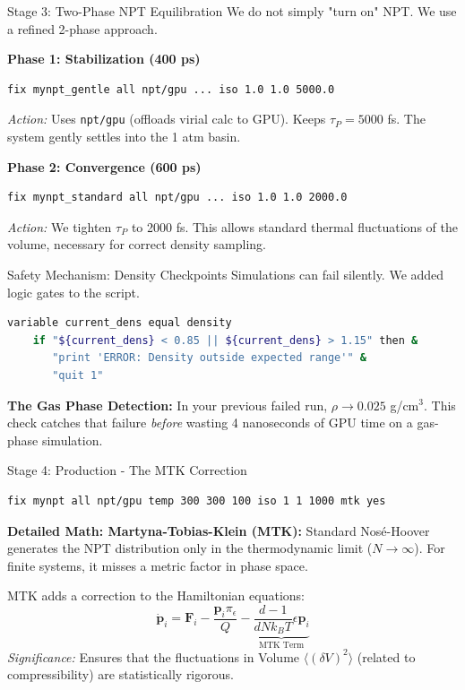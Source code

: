 \documentclass[aspectratio=169, 10pt]{beamer}
\begin{document}
\begin{frame}[fragile]{Stage 3: Two-Phase NPT Equilibration}
    We do not simply "turn on" NPT. We use a refined 2-phase approach.
    
    \textbf{Phase 1: Stabilization (400 ps)}
    \begin{lstlisting}[language=bash]
    fix mynpt_gentle all npt/gpu ... iso 1.0 1.0 5000.0
    \end{lstlisting}
    \textit{Action:} Uses \texttt{npt/gpu} (offloads virial calc to GPU). Keeps $\tau_P = 5000$ fs. The system gently settles into the 1 atm basin.

    \textbf{Phase 2: Convergence (600 ps)}
    \begin{lstlisting}[language=bash]
    fix mynpt_standard all npt/gpu ... iso 1.0 1.0 2000.0
    \end{lstlisting}
    \textit{Action:} We tighten $\tau_P$ to 2000 fs. This allows standard thermal fluctuations of the volume, necessary for correct density sampling.
\end{frame}

\begin{frame}[fragile]{Safety Mechanism: Density Checkpoints}
    Simulations can fail silently. We added logic gates to the script.

    \begin{lstlisting}[language=bash]
    variable current_dens equal density
    if "${current_dens} < 0.85 || ${current_dens} > 1.15" then &
       "print 'ERROR: Density outside expected range'" &
       "quit 1"
    \end{lstlisting}

    \textbf{The Gas Phase Detection:}
    In your previous failed run, $\rho \to 0.025$ g/cm$^3$.
    This check catches that failure \textit{before} wasting 4 nanoseconds of GPU time on a gas-phase simulation.
\end{frame}

\begin{frame}[fragile]{Stage 4: Production - The MTK Correction}
    \begin{lstlisting}[language=bash]
    fix mynpt all npt/gpu temp 300 300 100 iso 1 1 1000 mtk yes
    \end{lstlisting}

    \textbf{Detailed Math: Martyna-Tobias-Klein (MTK):}
    Standard Nosé-Hoover generates the NPT distribution only in the thermodynamic limit ($N \to \infty$). For finite systems, it misses a metric factor in phase space.
    
    MTK adds a correction to the Hamiltonian equations:
    \begin{equation}
        \dot{\mathbf{p}}_i = \mathbf{F}_i - \frac{\mathbf{p}_i \pi_{\epsilon}}{Q} - \underbrace{\frac{d-1}{dN k_B T} \epsilon \mathbf{p}_i}_{\text{MTK Term}}
    \end{equation}
    \textit{Significance:} Ensures that the fluctuations in Volume $\langle (\delta V)^2 \rangle$ (related to compressibility) are statistically rigorous.
\end{frame}
\end{document}
